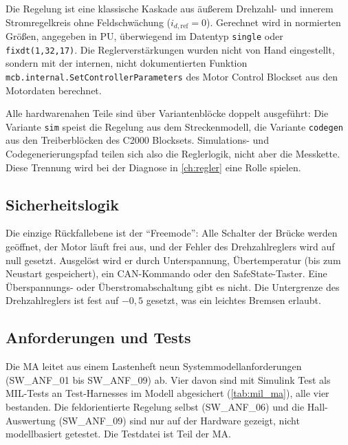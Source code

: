 Die Regelung ist eine klassische Kaskade aus äußerem Drehzahl- und innerem Stromregelkreis
ohne Feldschwächung ($i_{d,\mathrm{ref}} = 0$). Gerechnet wird in normierten Größen, angegeben in
\ac{PU}, überwiegend im Datentyp \texttt{single} oder \texttt{fixdt(1,32,17)}. Die
Reglerverstärkungen wurden nicht von Hand eingestellt, sondern mit der internen, nicht
dokumentierten Funktion \texttt{mcb.internal.SetControllerParameters} des Motor Control
Blockset aus den Motordaten berechnet.

Alle hardwarenahen Teile sind über Variantenblöcke doppelt ausgeführt: Die Variante
\texttt{sim} speist die Regelung aus dem Streckenmodell, die Variante \texttt{codegen}
aus den Treiberblöcken des C2000 Blocksets. Simulations- und Codegenerierungspfad teilen
sich also die Reglerlogik, nicht aber die Messkette. Diese Trennung wird bei der Diagnose
in \cref{ch:regler} eine Rolle spielen.

\subsection{Sicherheitslogik}

Die einzige Rückfallebene ist der \enquote{Freemode}: Alle Schalter der Brücke werden
geöffnet, der Motor läuft frei aus, und der Fehler des Drehzahlreglers wird auf null
gesetzt. Ausgelöst wird er durch Unterspannung, Übertemperatur (bis zum Neustart
gespeichert), ein CAN-Kommando oder den SafeState-Taster. Eine Überspannungs- oder
Überstromabschaltung gibt es nicht. Die Untergrenze des Drehzahlreglers ist fest auf
$-0{,}5$ gesetzt, was ein leichtes Bremsen erlaubt.

\subsection{Anforderungen und Tests}

Die \ac{MA} leitet aus einem Lastenheft neun Systemmodellanforderungen
(SW\_ANF\_01 bis SW\_ANF\_09) ab. Vier davon sind mit Simulink Test als \ac{MIL}-Tests an
Test-Harnesses im Modell abgesichert (\cref{tab:mil_ma}), alle vier bestanden. Die
feldorientierte Regelung selbst (SW\_ANF\_06) und die Hall-Auswertung (SW\_ANF\_09) sind
nur auf der Hardware gezeigt, nicht modellbasiert getestet. Die Testdatei
 ist Teil der \ac{MA}.

